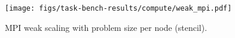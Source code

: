 \begin{figure}[t]
\centering
\texttt{[image: figs/task-bench-results/compute/weak\_mpi.pdf]}
\vspace{-0.6cm}
\caption{MPI weak scaling with problem size per node (stencil).\label{fig:weak-scaling-mpi}}
\vspace{-0.1cm}
\end{figure}
